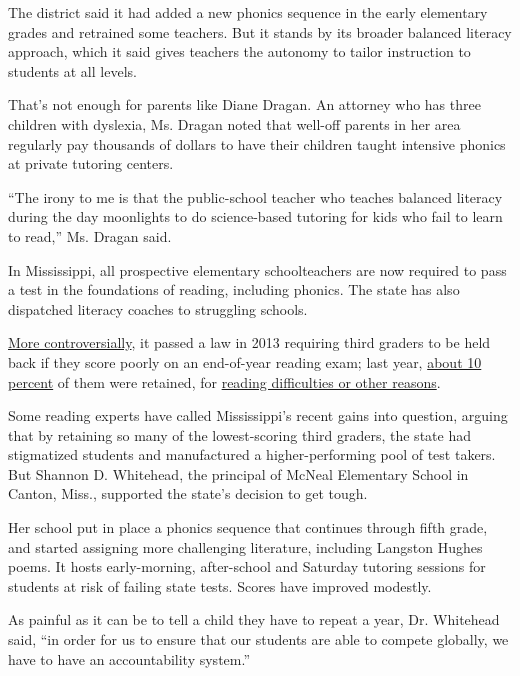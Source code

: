 The district said it had added a new phonics sequence in the early
elementary grades and retrained some teachers. But it stands by its
broader balanced literacy approach, which it said gives teachers the
autonomy to tailor instruction to students at all levels.

That's not enough for parents like Diane Dragan. An attorney who has
three children with dyslexia, Ms. Dragan noted that well-off parents in
her area regularly pay thousands of dollars to have their children
taught intensive phonics at private tutoring centers.

``The irony to me is that the public-school teacher who teaches balanced
literacy during the day moonlights to do science-based tutoring for kids
who fail to learn to read,'' Ms. Dragan said.

In Mississippi, all prospective elementary schoolteachers are now
required to pass a test in the foundations of reading, including
phonics. The state has also dispatched literacy coaches to struggling
schools.

\href{https://fordhaminstitute.org/national/commentary/mississippi-rising-partial-explanation-its-naep-improvement-it-holds-students}{More
controversially}, it passed a law in 2013 requiring third graders to be
held back if they score poorly on an end-of-year reading exam; last
year,
\href{https://www.mdek12.org/sites/default/files/Offices/MDE/SSE/lbpa_summary_2018.pdf}{about
10 percent} of them were retained, for
\href{https://hechingerreport.org/mississippi-made-the-biggest-leap-in-national-test-scores-this-year-is-this-controversial-law-the-reason-why/}{reading
difficulties or other reasons}.

Some reading experts have called Mississippi's recent gains into
question, arguing that by retaining so many of the lowest-scoring third
graders, the state had stigmatized students and manufactured a
higher-performing pool of test takers. But Shannon D. Whitehead, the
principal of McNeal Elementary School in Canton, Miss., supported the
state's decision to get tough.

Her school put in place a phonics sequence that continues through fifth
grade, and started assigning more challenging literature, including
Langston Hughes poems. It hosts early-morning, after-school and Saturday
tutoring sessions for students at risk of failing state tests. Scores
have improved modestly.

As painful as it can be to tell a child they have to repeat a year, Dr.
Whitehead said, ``in order for us to ensure that our students are able
to compete globally, we have to have an accountability system.''


